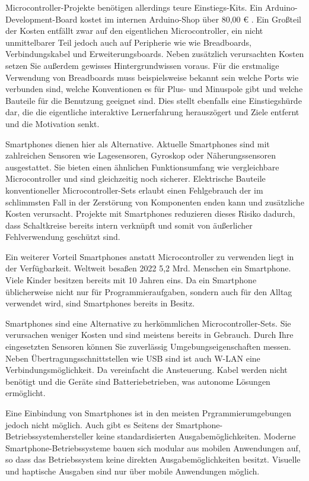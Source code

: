 \documentclass[11pt,a4paper]{report}
\begin{document}
Microcontroller-Projekte benötigen allerdings teure Einstiegs-Kits.
Ein Arduino-Development-Board kostet im internen Arduino-Shop über 80,00 € \cite{arduino_kit}.
Ein Großteil der Kosten entfällt zwar auf den eigentlichen Microcontroller, ein nicht unmittelbarer Teil jedoch auch auf Peripherie wie wie Breadboards, Verbindungskabel und Erweiterungsboards.
Neben zusätzlich verursachten Kosten setzen Sie außerdem gewisses Hintergrundwissen voraus.
Für die erstmalige Verwendung von Breadboards muss beispielsweise bekannt sein welche Ports wie verbunden sind, welche Konventionen es für Plus- und Minuspole gibt und welche Bauteile für die Benutzung geeignet sind.
Dies stellt ebenfalls eine Einstiegshürde dar, die die eigentliche interaktive Lernerfahrung herauszögert und Ziele entfernt und die Motivation senkt.

Smartphones dienen hier als Alternative.
Aktuelle Smartphones sind mit zahlreichen Sensoren wie Lagesensoren, Gyroskop oder Näherungssensoren ausgestattet.
Sie bieten einen ähnlichen Funktionsumfang wie vergleichbare Microcontroller und sind gleichzeitig noch sicherer.
Elektrische Bauteile konventioneller Microcontroller-Sets erlaubt einen Fehlgebrauch der im schlimmsten Fall in der Zerstörung von Komponenten enden kann und zusätzliche Kosten verursacht.
Projekte mit Smartphones reduzieren dieses Risiko dadurch, dass Schaltkreise bereits intern verknüpft und somit von äußerlicher Fehlverwendung geschützt sind.

Ein weiterer Vorteil Smartphones anstatt Microcontroller zu verwenden liegt in der Verfügbarkeit.
Weltweit besaßen 2022 5,2 Mrd. Menschen ein Smartphone. \cite{smartphone_users}
Viele Kinder besitzen bereits mit 10 Jahren \cite{bitkom_smartphones} eins.
Da ein Smartphone üblicherweise nicht nur für Programmieraufgaben, sondern auch für den Alltag verwendet wird, sind Smartphones bereits in Besitz.

Smartphones sind eine Alternative zu herkömmlichen Microcontroller-Sets.
Sie verursachen weniger Kosten und sind meistens bereits in Gebrauch.
Durch Ihre eingesetzten Sensoren können Sie zuverlässig Umgebungseigenschaften messen.
Neben Übertragungsschnittstellen wie USB sind ist auch W-LAN eine Verbindungsmöglichkeit.
Da vereinfacht die Ansteuerung.
Kabel werden nicht benötigt und die Geräte sind Batteriebetrieben, was autonome Lösungen ermöglicht.

Eine Einbindung von Smartphones ist in den meisten Prgrammierumgebungen jedoch nicht möglich.
Auch gibt es Seitens der Smartphone-Betriebssystemhersteller keine standardisierten Ausgabemöglichkeiten.
Moderne Smartphone-Betriebssysteme bauen sich modular aus mobilen Anwendungen auf, so dass das Betriebssystem keine direkten Ausgabemöglichkeiten besitzt.
Visuelle und haptische Ausgaben sind nur über mobile Anwendungen möglich.
\end{document}
